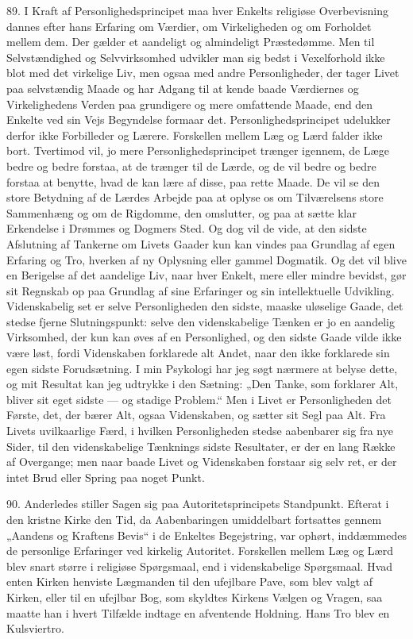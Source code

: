 \documentclass[12pt,a4paper,openany]{book}
\newcommand{\opage}[1]{\marginnote{\footnotesize\textit{[#1]}}}
\begin{document}
89. I Kraft af Personlighedsprincipet maa hver Enkelts religiøse
Overbevisning dannes efter hans Erfaring om Værdier, om Virkeligheden og
om Forholdet mellem dem. Der gælder et aandeligt og almindeligt
Præstedømme. Men til Selvstændighed
\opage{205}og Selvvirksomhed udvikler man sig bedst i Vexelforhold ikke
blot med det virkelige Liv, men ogsaa med andre Personligheder, der
tager Livet paa selvstændig Maade og har Adgang til at kende baade
Værdiernes og Virkelighedens Verden paa grundigere og mere omfattende
Maade, end den Enkelte ved sin Vejs Begyndelse formaar det.
Personlighedsprincipet udelukker derfor ikke Forbilleder og Lærere.
Forskellen mellem Læg og Lærd falder ikke bort. Tvertimod vil, jo mere
Personlighedsprincipet trænger igennem, de Læge bedre og bedre forstaa,
at de trænger til de Lærde, og de vil bedre og bedre forstaa at benytte,
hvad de kan lære af disse, paa rette Maade. De vil se den store
Betydning af de Lærdes Arbejde paa at oplyse os om Tilværelsens store
Sammenhæng og om de Rigdomme, den omslutter, og paa at sætte klar
Erkendelse i Drømmes og Dogmers Sted. Og dog vil de vide, at den sidste
Afslutning af Tankerne om Livets Gaader kun kan vindes paa Grundlag af
egen Erfaring og Tro, hverken af ny Oplysning eller gammel Dogmatik. Og
det vil blive en Berigelse af det aandelige Liv, naar hver Enkelt, mere
eller mindre bevidst, gør sit Regnskab op paa Grundlag af sine
Erfaringer og sin intellektuelle Udvikling. Videnskabelig set er selve
Personligheden den sidste, maaske uløselige Gaade, det stedse fjerne
Slutningspunkt: selve den videnskabelige Tænken er jo en aandelig
Virksomhed, der kun kan øves af en Personlighed, og den sidste Gaade
vilde ikke være løst, fordi Videnskaben forklarede alt Andet, naar den
ikke forklarede sin egen sidste Forudsætning. I min Psykologi har jeg
søgt nærmere at belyse dette, og mit Resultat kan jeg udtrykke i den
Sætning: „Den Tanke, som forklarer Alt, bliver sit eget sidste --- og
stadige Problem.“ Men i Livet er Personligheden det Første, det, der
bærer Alt, ogsaa Videnskaben, og sætter sit Segl paa Alt. Fra Livets
uvilkaarlige Færd, i hvilken Personligheden stedse aabenbarer sig fra
nye Sider, til den videnskabelige Tænknings sidste Resultater, er der en
lang Række af Overgange; men naar baade Livet og Videnskaben forstaar
sig selv ret, er der intet Brud eller Spring paa noget Punkt.

90. Anderledes stiller Sagen sig paa Autoritetsprincipets Standpunkt.
Efterat i den kristne Kirke den Tid, da Aabenbaringen umiddelbart
fortsattes gennem „Aandens og Kraftens Bevis“ i de Enkeltes Begejstring,
var ophørt, inddæmmedes de personlige Erfaringer ved kirkelig Autoritet.
Forskellen mellem Læg og Lærd blev snart større i religiøse Spørgsmaal,
end i videnskabelige
\opage{206}Spørgsmaal. Hvad enten Kirken henviste Lægmanden til den
ufejlbare Pave, som blev valgt af Kirken, eller til en ufejlbar Bog, som
skyldtes Kirkens Vælgen og Vragen, saa maatte han i hvert Tilfælde
indtage en afventende Holdning. Hans Tro blev en Kulsviertro.
\end{document}
